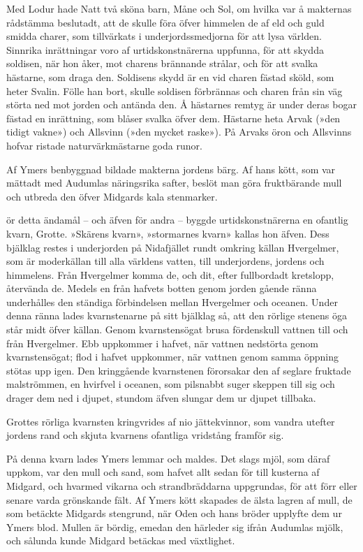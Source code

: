 Med Lodur hade Natt två sköna barn, Måne och Sol, om hvilka var å
makternas rådstämma beslutadt, att de skulle föra öfver himmelen de af
eld och guld smidda charer, som tillvärkats i underjordssmedjorna för
att lysa världen. Sinnrika inrättningar voro af urtidskonstnärerna
uppfunna, för att skydda soldisen, när hon åker, mot charens brännande
strålar, och för att svalka hästarne, som draga den. Soldisens skydd är
en vid charen fästad sköld, som heter Svalin. Fölle han bort, skulle
soldisen förbrännas och charen från sin väg störta ned mot jorden och
antända den. Å hästarnes remtyg är under deras bogar fästad en
inrättning, som blåser svalka öfver dem. Hästarne heta Arvak (»den
tidigt vakne») och Allsvinn (»den mycket raske»). På Arvaks öron och
Allsvinns hofvar ristade naturvärkmästarne goda runor.

Af Ymers benbyggnad bildade makterna jordens bärg. Af hans kött, som var
mättadt med Audumlas näringsrika safter, beslöt man göra fruktbärande
mull och utbreda den öfver Midgards kala stenmarker.



\dropcapF ör detta ändamål -- och äfven för andra -- byggde urtidskonstnärerna en
ofantlig kvarn, Grotte. »Skärens kvarn», »stormarnes kvarn» kallas hon
äfven. Dess bjälklag restes i underjorden på Nidafjället rundt omkring
källan Hvergelmer, som är moderkällan till alla världens vatten, till
underjordens, jordens och himmelens. Från Hvergelmer komma de, och dit,
efter fullbordadt kretslopp, återvända de. Medels en från hafvets botten
genom jorden gående ränna underhålles den ständiga förbindelsen mellan
Hvergelmer och oceanen. Under denna ränna lades kvarnstenarne på sitt
bjälklag så, att den rörlige stenens öga står midt öfver källan. Genom
kvarnstensögat brusa fördenskull vattnen till och från Hvergelmer. Ebb
uppkommer i hafvet, när vattnen nedstörta
genom kvarnstensögat; flod i hafvet uppkommer, när vattnen genom samma
öppning stötas upp igen. Den kringgående kvarnstenen förorsakar den af
seglare fruktade malströmmen, en hvirfvel i oceanen, som pilsnabbt suger
skeppen till sig och drager dem ned i djupet, stundom äfven slungar dem
ur djupet tillbaka.

Grottes rörliga kvarnsten kringvrides af nio jättekvinnor, som vandra
utefter jordens rand och skjuta kvarnens ofantliga vridstång framför
sig.

På denna kvarn lades Ymers lemmar och maldes. Det slags mjöl, som däraf
uppkom, var den mull och sand, som hafvet allt sedan för till kusterna
af Midgard, och hvarmed vikarna och strandbräddarna uppgrundas, för att
förr eller senare varda grönskande fält. Af Ymers kött skapades de älsta
lagren af mull, de som betäckte Midgards stengrund, när Oden och hans
bröder upplyfte dem ur Ymers blod. Mullen är bördig, emedan den härleder
sig ifrån Audumlas mjölk, och sålunda kunde Midgard betäckas med
växtlighet.

